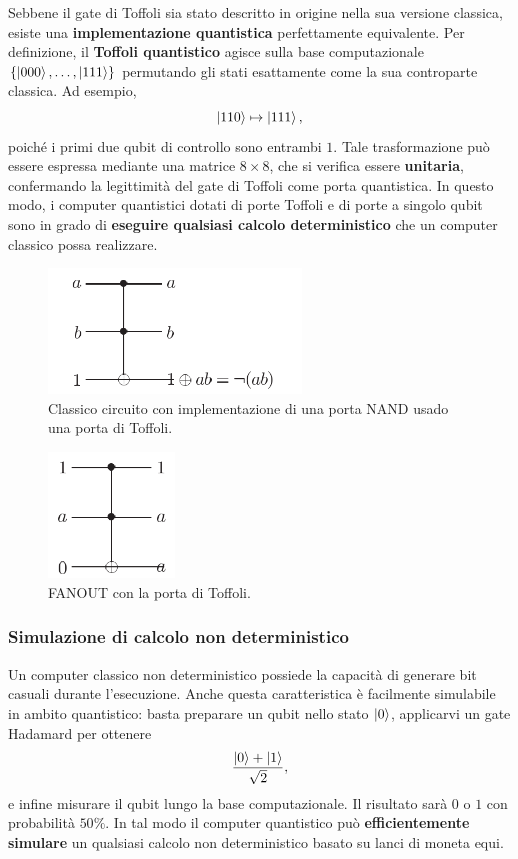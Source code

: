 \documentclass[a4paper,12pt]{report}
\theoremstyle{plain}
\begin{document}
Sebbene il gate di Toffoli sia stato descritto in origine nella sua versione classica, esiste una \textbf{implementazione quantistica} perfettamente equivalente. Per definizione, il \textbf{Toffoli quantistico} agisce sulla base computazionale $\{\ket{000},\dots,\ket{111}\}$ permutando gli stati esattamente come la sua controparte classica. Ad esempio,
\[
\ket{110} \mapsto \ket{111},
\]
poiché i primi due qubit di controllo sono entrambi $1$. Tale trasformazione può essere espressa mediante una matrice $8\times8$, che si verifica essere \textbf{unitaria}, confermando la legittimità del gate di Toffoli come porta quantistica.
In questo modo, i computer quantistici dotati di porte Toffoli e di porte a singolo qubit sono in grado di \textbf{eseguire qualsiasi calcolo deterministico} che un computer classico possa realizzare.
\begin{figure}[H]
    \centering
    \includegraphics[width=0.6\textwidth]{Immagine14.png} 
    \caption{Classico circuito con implementazione di una porta NAND usado una porta di Toffoli.}
    \label{Immagine14}
\end{figure}
\begin{figure}[H]
    \centering
    \includegraphics[width=0.3\textwidth]{Immagine15.png} 
    \caption{FANOUT con la porta di Toffoli.}
    \label{Immagine15}
\end{figure}
\subsubsection{Simulazione di calcolo non deterministico}
Un computer classico non deterministico possiede la capacità di generare bit casuali durante l'esecuzione. Anche questa caratteristica è facilmente simulabile in ambito quantistico: basta preparare un qubit nello stato $\ket{0}$, applicarvi un gate Hadamard per ottenere
\[
\frac{\ket{0} + \ket{1}}{\sqrt{2}},
\]
e infine misurare il qubit lungo la base computazionale. Il risultato sarà $0$ o $1$ con probabilità $50\%$. In tal modo il computer quantistico può \textbf{efficientemente simulare} un qualsiasi calcolo non deterministico basato su lanci di moneta equi.
\end{document}
